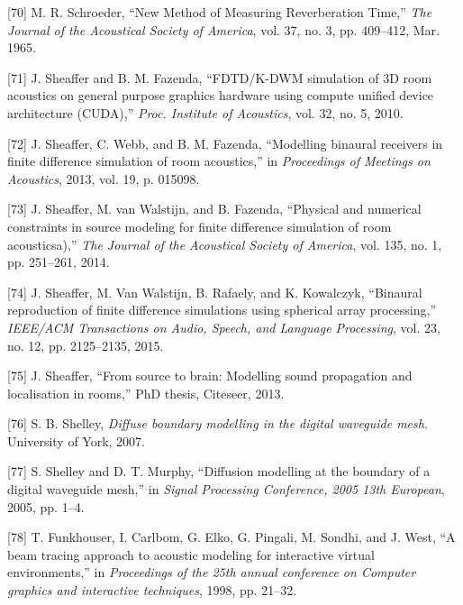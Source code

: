 \documentclass[]{scrreprt}
\begin{document}
\hypertarget{ref-schroederux5fnewux5f1965}{}
{[}70{]} M. R. Schroeder, ``New Method of Measuring Reverberation
Time,'' \emph{The Journal of the Acoustical Society of America}, vol.
37, no. 3, pp. 409--412, Mar. 1965.

\hypertarget{ref-sheafferux5ffdtdux2fk-dwmux5f2010}{}
{[}71{]} J. Sheaffer and B. M. Fazenda, ``FDTD/K-DWM simulation of 3D
room acoustics on general purpose graphics hardware using compute
unified device architecture (CUDA),'' \emph{Proc. Institute of
Acoustics}, vol. 32, no. 5, 2010.

\hypertarget{ref-sheafferux5fmodellingux5f2013}{}
{[}72{]} J. Sheaffer, C. Webb, and B. M. Fazenda, ``Modelling binaural
receivers in finite difference simulation of room acoustics,'' in
\emph{Proceedings of Meetings on Acoustics}, 2013, vol. 19, p. 015098.

\hypertarget{ref-sheafferux5fphysicalux5f2014}{}
{[}73{]} J. Sheaffer, M. van Walstijn, and B. Fazenda, ``Physical and
numerical constraints in source modeling for finite difference
simulation of room acousticsa),'' \emph{The Journal of the Acoustical
Society of America}, vol. 135, no. 1, pp. 251--261, 2014.

\hypertarget{ref-sheafferux5fbinauralux5f2015}{}
{[}74{]} J. Sheaffer, M. Van Walstijn, B. Rafaely, and K. Kowalczyk,
``Binaural reproduction of finite difference simulations using spherical
array processing,'' \emph{IEEE/ACM Transactions on Audio, Speech, and
Language Processing}, vol. 23, no. 12, pp. 2125--2135, 2015.

\hypertarget{ref-sheafferux5fsourceux5f2013}{}
{[}75{]} J. Sheaffer, ``From source to brain: Modelling sound
propagation and localisation in rooms,'' PhD thesis, Citeseer, 2013.

\hypertarget{ref-shelleyux5fdiffuseux5f2007}{}
{[}76{]} S. B. Shelley, \emph{Diffuse boundary modelling in the digital
waveguide mesh}. University of York, 2007.

\hypertarget{ref-shelleyux5fdiffusionux5f2005}{}
{[}77{]} S. Shelley and D. T. Murphy, ``Diffusion modelling at the
boundary of a digital waveguide mesh,'' in \emph{Signal Processing
Conference, 2005 13th European}, 2005, pp. 1--4.

\hypertarget{ref-funkhouserux5fbeamux5f1998}{}
{[}78{]} T. Funkhouser, I. Carlbom, G. Elko, G. Pingali, M. Sondhi, and
J. West, ``A beam tracing approach to acoustic modeling for interactive
virtual environments,'' in \emph{Proceedings of the 25th annual
conference on Computer graphics and interactive techniques}, 1998, pp.
21--32.
\end{document}
